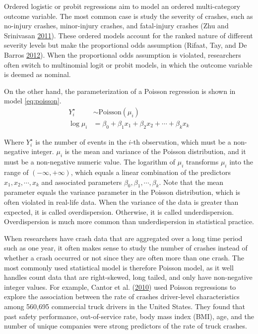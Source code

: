 \documentclass[12pt]{book}
\numberwithin{equation}{chapter}
\begin{document}
Ordered logistic or probit regressions aim to model an ordered multi-category outcome variable. The most common case is study the severity of crashes, such as no-injury crashes, minor-injury crashes, and fatal-injury crashes (Zhu and Srinivasan \protect\hyperlink{ref-zhu2011comprehensive}{2011}). These ordered models account for the ranked nature of different severity levels but make the proportional odds assumption (Rifaat, Tay, and De Barros \protect\hyperlink{ref-rifaat2012severity}{2012}). When the proportional odds assumption is violated, researchers often switch to multinomial logit or probit models, in which the outcome variable is deemed as nominal.

On the other hand, the parameterization of a Poisson regression is shown in model \eqref{eq:poisson}.
\begin{equation}
\begin{split}
Y_i^\star & \sim \text{Poisson}(\mu_i) \\
\log\mu_i & = \beta_0 + \beta_1x_1 + \beta_2x_2 + \cdots + \beta_kx_k
\label{eq:poisson}
\end{split}
\end{equation}

Where \(Y_i^\star\) is the number of events in the \(i\)-th observation, which must be a non-negative integer. \(\mu_i\) is the mean and variance of the Poisson distribution, and it must be a non-negative numeric value. The logarithm of \(\mu_i\) transforms \(\mu_i\) into the range of \((-\infty, +\infty)\), which equals a linear combination of the predictors \(x_1, x_2, \cdots, x_k\) and associated parameters \(\beta_0, \beta_1, \cdots, \beta_k\). Note that the mean parameter equals the variance parameter in the Poisson distribution, which is often violated in real-life data. When the variance of the data is greater than expected, it is called overdispersion. Otherwise, it is called underdispersion. Overdispersion is much more common than underdispersion in statistical practice.

When researchers have crash data that are aggregated over a long time period such as one year, it often makes sense to study the number of crashes instead of whether a crash occurred or not since they are often more than one crash. The most commonly used statistical model is therefore Poisson model, as it well handles count data that are right-skewed, long tailed, and only have non-negative integer values. For example, Cantor et al. (\protect\hyperlink{ref-cantor2010driver}{2010}) used Poisson regressions to explore the association between the rate of crashes driver-level characteristics among 560,695 commercial truck drivers in the United States. They found that past safety performance, out-of-service rate, body mass index (BMI), age, and the number of unique companies were strong predictors of the rate of truck crashes.
\end{document}
